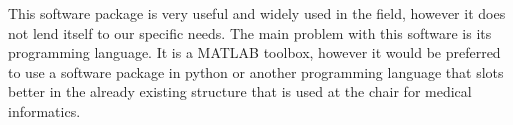 This software package is very useful and widely used in the field, however it does not lend itself to our specific needs.
The main problem with this software is its programming language. It is a MATLAB toolbox, however it would be preferred to use a software package in python or another programming language that slots better in the already existing structure that is used at the chair for medical informatics.  

